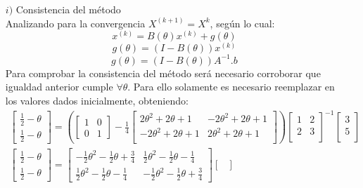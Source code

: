 \begin{itemize}
\item [$i)$] Consistencia del método\\

Analizando para la convergencia $X^{(k+1)}=X^k$, según lo cual:\\
$$x^{(k)} = B(\theta)x^{(k)} + g(\theta)$$
$$g(\theta) =  (I-B(\theta))x^{(k)}$$
$$g(\theta) = (I-B(\theta))A^{-1}.b $$
Para comprobar la consistencia del método será necesario corroborar que igualdad anterior cumple $\forall \theta$.
Para ello solamente es necesario reemplazar en los valores dados inicialmente, obteniendo:
\begin{gather*}
	\begin{bmatrix}
    	\frac{1}{2} -\theta \\
    	\frac{1}{2} -\theta 
	\end{bmatrix} = (
   \begin{bmatrix}
       1   &     0 \\
       0   &     1 \end{bmatrix} - 
       \frac{1}{4}
   \begin{bmatrix}
       2\theta^2 + 2\theta + 1   &     -2\theta^2 + 2\theta + 1 \\
       -2\theta^2 + 2\theta + 1   &     2\theta^2 + 2\theta + 1 \\
	\end{bmatrix})
    \begin{bmatrix}
       1   &     2 \\
       2   &     3 \\
	\end{bmatrix}^{-1}
    \begin{bmatrix}
      3 \\
      5 \\
	\end{bmatrix}
    \\
    \begin{bmatrix}
    	\frac{1}{2} -\theta \\
    	\frac{1}{2} -\theta 
	\end{bmatrix} = 
   	\begin{bmatrix}
       -\frac{1}{2}\theta^2 - \frac{1}{2}\theta + \frac{3}{4} & \frac{1}{2}\theta^2 - \frac{1}{2}\theta - \frac{1}{4} \\
       \frac{1}{2}\theta^2 - \frac{1}{2}\theta - \frac{1}{4} & -\frac{1}{2}\theta^2 - \frac{1}{2}\theta + \frac{3}{4}
	\end{bmatrix}
    \begin{bmatrix}

\end{bmatrix}
\end{gather*}
\end{itemize}
